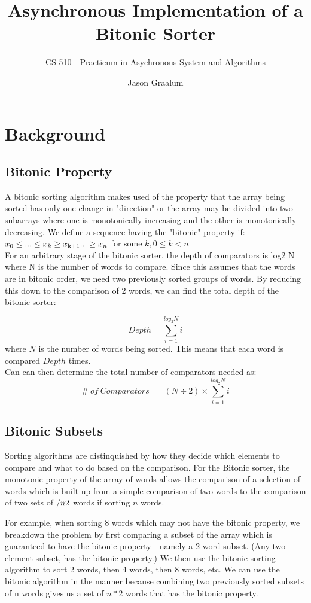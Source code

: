 \documentclass[11pt]{scrartcl}
\author{Jason Graalum}
\title{Asynchronous Implementation of a Bitonic Sorter}
\subtitle{CS 510 - Practicum in Asychronous System and Algorithms }
\date{}
\begin{document}
\maketitle

\section{Background}
\subsection{Bitonic Property}
A bitonic sorting algorithm makes used of the property that the array being sorted has only one change in "direction" or the array may be divided into two subarrays where one is monotonically increasing and the other is monotonically decreasing. We define a sequence having the "bitonic" property if:\\

$x_0 \leq ... \leq x_k \geq x\textsubscript{k+1} ... \geq x_n$ for some $k, 0 \leq k < n$\\

For an arbitrary stage of the bitonic sorter, the depth of comparators is log2 N where N is the number of words to compare.  Since this assumes that the words are in bitonic order, we need two previously sorted groups of words.  By reducing this down to the comparison of 2 words, we can find the total depth of the bitonic sorter:

$$Depth = \sum_{i=1}^{log_2N} i $$ where $N$ is the number of words being sorted. This means that each word is compared $Depth$ times. \\
Can can then determine the total number of comparators needed as:\\
$$\#\ of\ Comparators\ =\ (N\div2) \times \sum_{i=1}^{log_2N} i $$

\subsection{Bitonic Subsets}
Sorting algorithms are distinquished by how they decide which elements to compare and what to do based on the comparison.  For the Bitonic sorter, the monotonic property of the array of words allows the comparison of a selection of words which is built up from a simple comparison of two words to the comparison of two sets of $/n\/2$ words if sorting $n$ words.

For example, when sorting 8 words which may not have the bitonic property, we breakdown the problem by first comparing a subset of the array which is guaranteed to have the bitonic property - namely a 2-word subset. (Any two element subset, has the bitonic property.)
We then use the bitonic sorting algorithm to sort 2 words, then 4 words, then 8 words, etc.  We can use the bitonic algorithm in the manner because combining two previously sorted subsets of n words gives us a set of $n*2$ words that has the bitonic property.
\end{document}
